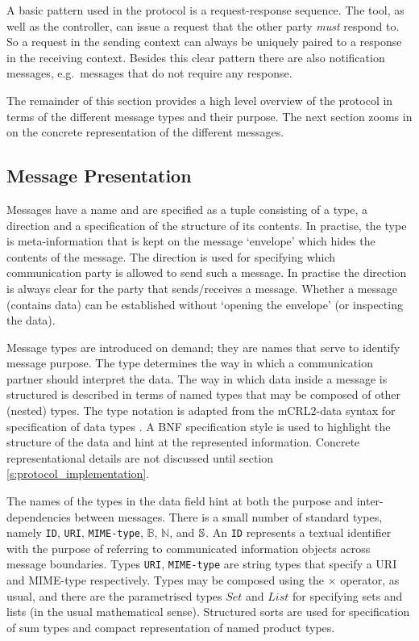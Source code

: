 \documentclass{article}
\newcommand{\String}{\ensuremath \mathbb{S}\xspace}
\newcommand{\Id}{\texttt{ID}\xspace}
\newcommand{\URI}{\texttt{URI}\xspace}
\newcommand{\MIMEtype}{\texttt{MIME-type}\xspace}
\begin{document}
  A basic pattern used in the protocol is a request-response sequence. The
  tool, as well as the controller, can issue a request that the other party
  \emph{must} respond to. So a request in the sending context can always be
  uniquely paired to a response in the receiving context. Besides this clear
  pattern there are also notification messages, e.g.\ messages that do not
  require any response.

  The remainder of this section provides a high level overview of the protocol
  in terms of the different message types and their purpose. The next section
  zooms in on the concrete representation of the different messages.

  \subsection{Message Presentation}

   Messages have a name and are specified as a tuple consisting of a type, a
   direction and a specification of the structure of its contents. In practise,
   the type is meta-information that is kept on the message `envelope' which
   hides the contents of the message. The direction is used for specifying
   which communication party is allowed to send such a message. In practise the
   direction is always clear for the party that sends/receives a message.
   Whether a message (contains data) can be established without `opening the
   envelope' (or inspecting the data).
   
   Message types are introduced on demand; they are names that serve to
   identify message purpose. The type determines the way in which a
   communication partner should interpret the data. The way in which data
   inside a message is structured is described in terms of named types that may
   be composed of other (nested) types. The type notation is adapted from the
   mCRL2-data syntax for specification of data types
   \cite{groote_et_al:DSP:2007:862}. A BNF specification style is used to
   highlight the structure of the data and hint at the represented information.
   Concrete representational details are not discussed until section
   \ref{s:protocol_implementation}.

   The names of the types in the data field hint at both the purpose and
   inter-dependencies between messages. There is a small number of standard
   types, namely \Id, \URI, \MIMEtype, $\mathbb{B}$, $\mathbb{N}$, and
   $\String$.  An \Id represents a textual identifier with the purpose of
   referring to communicated information objects across message boundaries.
   Types \URI, \MIMEtype are string types that specify a URI \cite{rfc3305} and
   MIME-type \cite{rfc2045} respectively.
   Types may be composed using the $\times$ operator, as usual, and there are
   the parametrised types $Set$ and $List$ for specifying sets and lists (in
   the usual mathematical sense). Structured sorts are used for specification
   of sum types and compact representation of named product types.
\end{document}

